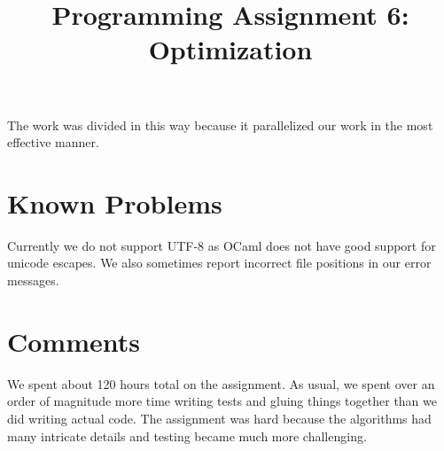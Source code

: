 \documentclass{hw} \title{Programming Assignment 6:\\ Optimization}
\begin{document}
The work was divided in this way because it parallelized our work in the most
effective manner.

\section{Known Problems}\label{sec:problems} Currently we do not support UTF-8
as OCaml does not have good support for unicode escapes. We also sometimes
report incorrect file positions in our error messages.

\section{Comments}\label{sec:comments} We spent about 120 hours total on the
assignment. As usual, we spent over an order of magnitude more time writing
tests and gluing things together than we did writing actual code. The
assignment was hard because the algorithms had many intricate details and
testing became much more challenging.
\end{document}

